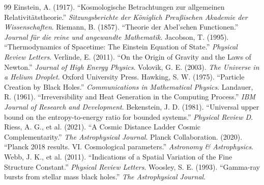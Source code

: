 \documentclass[11pt,a4paper]{article}
\theoremstyle{plain}
\theoremstyle{definition}
\theoremstyle{remark}
\begin{document}
\newpage
\begin{thebibliography}{99}
 Einstein, A. (1917). ``Kosmologische Betrachtungen zur allgemeinen Relativitätstheorie.'' \textit{Sitzungsberichte der Königlich Preußischen Akademie der Wissenschaften}.
 Riemann, B. (1857). ``Theorie der Abel'schen Functionen.'' \textit{Journal für die reine und angewandte Mathematik}.
 Jacobson, T. (1995). ``Thermodynamics of Spacetime: The Einstein Equation of State.'' \textit{Physical Review Letters}.
 Verlinde, E. (2011). ``On the Origin of Gravity and the Laws of Newton.'' \textit{Journal of High Energy Physics}.
 Volovik, G. E. (2003). \textit{The Universe in a Helium Droplet}. Oxford University Press.
 Hawking, S. W. (1975). ``Particle Creation by Black Holes.'' \textit{Communications in Mathematical Physics}.
 Landauer, R. (1961). ``Irreversibility and Heat Generation in the Computing Process.'' \textit{IBM Journal of Research and Development}.
 Bekenstein, J. D. (1981). ``Universal upper bound on the entropy-to-energy ratio for bounded systems.'' \textit{Physical Review D}.
 Riess, A. G., et al. (2021). ``A Cosmic Distance Ladder Cosmic Complementarity.'' \textit{The Astrophysical Journal}.
 Planck Collaboration. (2020). ``Planck 2018 results. VI. Cosmological parameters.'' \textit{Astronomy \& Astrophysics}.
 Webb, J. K., et al. (2011). ``Indications of a Spatial Variation of the Fine Structure Constant.'' \textit{Physical Review Letters}.
 Woosley, S. E. (1993). ``Gamma-ray bursts from stellar mass black holes.'' \textit{The Astrophysical Journal}.
\end{thebibliography}
\end{document}
